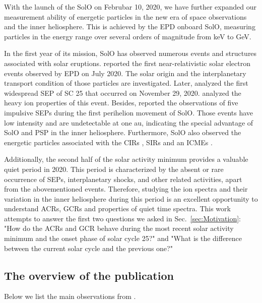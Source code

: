 With the launch of the \ac{SolO} on Februbar 10, 2020, we have further expanded our measurement ability of energetic particles in the new era of space observations and the inner heliosphere. This is achieved by the \ac{EPD} onboard \ac{SolO}, measuring particles in the energy range over several orders of magnitude from keV to GeV.

In the first year of its mission, \ac{SolO} has observed numerous events and structures associated with solar eruptions. \citet{GomezHerrero-2021-SolO} reported the first near-relativistic solar electron events observed by \ac{EPD} on July 2020. The solar origin and the interplanetary transport condition of those particles are investigated. Later, \citet{Kolhoff2021AA} analyzed the first widespread \ac{SEP} of \ac{SC} 25 that occurred on November 29, 2020. \citet{Mason2021AA} analyzed the heavy ion properties of this event. Besides, \citet{Mason2021AA_he3rich} reported the observations of five impulsive \acp{SEP} during the first perihelion movement of \ac{SolO}. Those events have low intensity and are undetectable at one au, indicating the special advantage of \ac{SolO} and \acs{PSP} in the inner heliosphere. Furthermore, \ac{SolO} also observed the energetic particles associated with the \acp{CIR} \citep{Allen2021AA_suprathermal}, \acp{SIR} \citep{Aran2021AA} and an \acp{ICME} \citep{Kilpua2021AA}.


Additionally, the second half of the solar activity minimum provides a valuable quiet period in 2020. This period is characterized by the absent or rare occurrence of \acp{SEP}, interplanetary shocks, and other related activities, apart from the abovementioned events. Therefore, studying the ion spectra and their variation in the inner heliosphere during this period is an excellent opportunity to understand \acp{ACR}, \acp{GCR} and properties of quiet time spectra. 
This work attempts to answer the first two questions we asked in Sec.~\ref{sec:Motivation}: "How do the \acp{ACR} and \ac{GCR} behave during the most recent solar activity minimum and the onset phase of solar cycle 25?" and "What is the difference between the current solar cycle and the previous one?"

\subsection*{The overview of the publication}

Below we list the main observations from \citet{Mason-2021-SolOQuietTime}.

